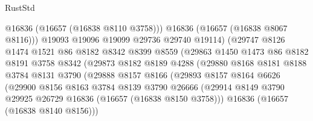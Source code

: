 \begin{lexlean}{RustStd}
\begin{coremodule}
                                  @16836
                                  (@16657 (@16838 @8110 @3758)))
                                @16836
                                (@16657 (@16838 @8067 @8116)))
                              @19093
                              @19096
                              @19099
                              @29736
                              @29740
                              @19114)
                            (@29747
                              @8126
                              @1474
                              @1521
                              @86
                              @8182
                              @8342
                              @8399
                              @8559
                              (@29863
                                @1450
                                @1473
                                @86
                                @8182
                                @8191
                                @3758
                                @8342
                                (@29873
                                  @8182
                                  @8189
                                  @4288
                                  (@29880
                                    @8168
                                    @8181
                                    @8188
                                    @3784
                                    @8131
                                    @3790
                                    (@29888
                                      @8157
                                      @8166
                                      (@29893
                                        @8157
                                        @8164
                                        @6626
                                        (@29900
                                          @8156
                                          @8163
                                          @3784
                                          @8139
                                          @3790
                                          @26666
                                          (@29914
                                            @8149
                                            @3790
                                            @29925
                                            @26729
                                            @16836
                                            (@16657 (@16838 @8150 @3758)))
                                          @16836
                                          (@16657 (@16838 @8140 @8156)))

\end{coremodule}
\end{lexlean}
